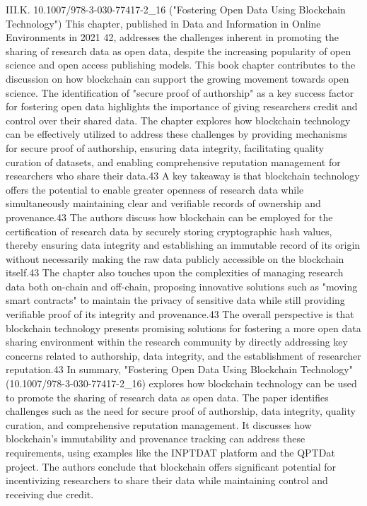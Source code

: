 \documentclass{article}
\begin{document}
III.K. 10.1007/978-3-030-77417-2_16 ("Fostering Open Data Using Blockchain Technology")
This chapter, published in Data and Information in Online Environments in 2021 42, addresses the challenges inherent in promoting the sharing of research data as open data, despite the increasing popularity of open science and open access publishing models. This book chapter contributes to the discussion on how blockchain can support the growing movement towards open science. The identification of "secure proof of authorship" as a key success factor for fostering open data highlights the importance of giving researchers credit and control over their shared data. The chapter explores how blockchain technology can be effectively utilized to address these challenges by providing mechanisms for secure proof of authorship, ensuring data integrity, facilitating quality curation of datasets, and enabling comprehensive reputation management for researchers who share their data.43 A key takeaway is that blockchain technology offers the potential to enable greater openness of research data while simultaneously maintaining clear and verifiable records of ownership and provenance.43 The authors discuss how blockchain can be employed for the certification of research data by securely storing cryptographic hash values, thereby ensuring data integrity and establishing an immutable record of its origin without necessarily making the raw data publicly accessible on the blockchain itself.43 The chapter also touches upon the complexities of managing research data both on-chain and off-chain, proposing innovative solutions such as "moving smart contracts" to maintain the privacy of sensitive data while still providing verifiable proof of its integrity and provenance.43 The overall perspective is that blockchain technology presents promising solutions for fostering a more open data sharing environment within the research community by directly addressing key concerns related to authorship, data integrity, and the establishment of researcher reputation.43
In summary, "Fostering Open Data Using Blockchain Technology" (10.1007/978-3-030-77417-2_16) explores how blockchain technology can be used to promote the sharing of research data as open data. The paper identifies challenges such as the need for secure proof of authorship, data integrity, quality curation, and comprehensive reputation management. It discusses how blockchain's immutability and provenance tracking can address these requirements, using examples like the INPTDAT platform and the QPTDat project. The authors conclude that blockchain offers significant potential for incentivizing researchers to share their data while maintaining control and receiving due credit.
\end{document}
